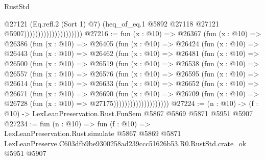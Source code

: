 \begin{lexlean}{RustStd}
\begin{coremodule}
                                            @27121
                                            (Eq.refl.{2} (Sort 1) @7)
                                            (heq_of_eq.{1}
                                              @5892
                                              @27118
                                              @27121
                                              @5907)))))))))))))))))))))
@27216 := fun (x : @10) =>
  @26367
    (fun (x : @10) =>
    @26386
      (fun (x : @10) =>
      @26405
        (fun (x : @10) =>
        @26424
          (fun (x : @10) =>
          @26443
            (fun (x : @10) =>
            @26462
              (fun (x : @10) =>
              @26481
                (fun (x : @10) =>
                @26500
                  (fun (x : @10) =>
                  @26519
                    (fun (x : @10) =>
                    @26538
                      (fun (x : @10) =>
                      @26557
                        (fun (x : @10) =>
                        @26576
                          (fun (x : @10) =>
                          @26595
                            (fun (x : @10) =>
                            @26614
                              (fun (x : @10) =>
                              @26633
                                (fun (x : @10) =>
                                @26652
                                  (fun (x : @10) =>
                                  @26671
                                    (fun (x : @10) =>
                                    @26690
                                      (fun (x : @10) =>
                                      @26709
                                        (fun (x : @10) =>
                                        @26728 (fun (x : @10) => @27175))))))))))))))))))))
@27224 := (n : @10) -> (f : @10) -> LexLeanPreservation.Rust.FunSem @5867 @5869 @5871 @5951 @5907
@27234 := fun (n : @10) =>
  fun (f : @10) =>
  LexLeanPreservation.Rust.simulate
    @5867
    @5869
    @5871
    LexLeanPreserve.C603dfb9be9300258ad239ccc51626b53.R0.RustStd.crate_ok
    @5951
    @5907
\end{coremodule}
\end{lexlean}
